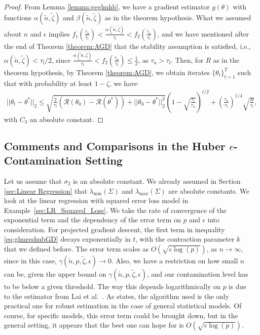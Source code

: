 \documentclass{article}
\begin{document}
\begin{proof}
From Lemma \ref{lemma:geglmhb}, we have a gradient estimator $g(\theta)$ with functions $\alpha(\widetilde{n}, \widetilde{\zeta})$ and $\beta(\widetilde{n}, \widetilde{\zeta})$ as in the theorem hypothesis. What we assumed about $n$ and $\epsilon$ implies $f_1\left(\frac{\tau_u}{\tau_l}\right) < \frac{\alpha(\widetilde{n}, \widetilde{\zeta})}{\tau_l} < f_2\left(\frac{\tau_u}{\tau_l}\right)$, and we have mentioned after the end of Theorem \ref{theorem:AGD} that the stability assumption is satisfied, i.e., $\alpha(\widetilde{n}, \widetilde{\zeta}) < \tau_l/2$, since $\frac{\alpha(\widetilde{n}, \widetilde{\zeta})}{\tau_l} < f_2\left(\frac{\tau_u}{\tau_l}\right) \leq \frac{1}{2}$, as $\tau_u > \tau_l$. Then, for $R$ as in the theorem hypothesis, by Theorem \ref{theorem:AGD}, we obtain iterates $\{\theta_t\}_{t = 1}^T$ such that with probability at least $1 - \zeta$, we have
\begin{align*}
||\theta_t - \theta^*||_2 \leq \sqrt{\frac{2}{\tau_l}\left(\mathcal{R}(\theta_0) - \mathcal{R}(\theta^*)\right) + ||\theta_0 - \theta^*||_2^2}\left(1 - \sqrt{\frac{\tau_l}{\tau_u}}\right)^{t/2} + \left(\frac{\tau_u}{\tau_l}\right)^{1/4}\sqrt{\frac{R}{\tau_l}},
\end{align*}
with $C_3$ an absolute constant.
\end{proof}


\subsection{Comments and Comparisons in the Huber $\epsilon$-Contamination Setting}

Let us assume that $\sigma_2$ is an absolute constant. We already assumed in Section \ref{sec:Linear Regression} that $\lambda_{\min}(\Sigma)$ and $\lambda_{\max}(\Sigma)$ are absolute constants. We look at the linear regression with squared error loss model in Example~\ref{sec:LR_Squared_Loss}. We take the rate of convergence of the exponential term and the dependency of the error term on $p$ and $\epsilon$ into consideration. For projected gradient descent, the first term in inequality \eqref{eq:glmreshubGD} decays exponentially in $t$, with the contraction parameter $k$ that we defined before. The error term scales as $O\left(\sqrt{\epsilon \log(p)}\right)$, as $n \rightarrow \infty$, since in this case, $\gamma(\widetilde{n}, p, \widetilde{\zeta}, \epsilon) \rightarrow 0$. Also, we have a restriction on how small $n$ can be, given the upper bound on $\gamma(\widetilde{n}, p, \widetilde{\zeta}, \epsilon)$, and our contamination level has to be below a given threshold. The way this depends logarithmically on $p$ is due to the estimator from Lai et al.~\cite{Vpala}. As \cite{RE} states, the algorithm used is the only practical one for robust estimation in the case of general statistical models. Of course, for specific models, this error term could be brought down, but in the general setting, it appears that the best one can hope for is $O\left(\sqrt{\epsilon \log(p)}\right)$.
\end{document}
